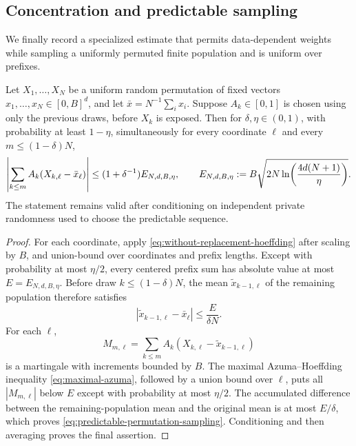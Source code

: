 \subsection{Concentration and predictable sampling}
\label{sec:probabilistic-tools}
\label{sec:standard-concentration}



We finally record a specialized estimate that permits data-dependent weights
while sampling a uniformly permuted finite population and is uniform over
prefixes.

\begin{lemma}
\label{lem:predictable-permutation-sampling}
Let $X_1,\ldots,X_N$ be a uniform random permutation of fixed vectors
$x_1,\ldots,x_N\in[0,B]^d$, and let
$\bar x=N^{-1}\sum_i x_i$.  Suppose $A_k\in[0,1]$ is chosen using only the
previous draws, before $X_k$ is exposed.  Then for
$\delta,\eta\in(0,1)$, with probability at least
$1-\eta$, simultaneously for every coordinate $\ell$ and every
$m\le(1-\delta)N$,
\begin{equation}
 \left|\sum_{k\le m}A_k(X_{k,\ell}-\bar x_\ell)\right|
 \le(1+\delta^{-1})E_{N,d,B,\eta},
 \qquad
 E_{N,d,B,\eta}\mathrel{:=}
 B\sqrt{2N\ln\!\left(\frac{4d(N+1)}{\eta}\right)}.
 \label{eq:predictable-permutation-sampling}
\end{equation}
The statement remains valid after conditioning on independent private
randomness used to choose the predictable sequence.
\end{lemma}

\begin{proof}
For each coordinate, apply
\cref{eq:without-replacement-hoeffding} after scaling by $B$, and union-bound
over coordinates and prefix lengths.  Except with probability at most
$\eta/2$, every centered prefix sum has absolute value at most
$E=E_{N,d,B,\eta}$.  Before draw $k\le(1-\delta)N$, the mean
$\widetilde x_{k-1,\ell}$ of
the remaining population therefore satisfies
\[
 |\widetilde x_{k-1,\ell}-\bar x_\ell|\le \frac{E}{\delta N}.
\]
For each $\ell$,
\[
 M_{m,\ell}=\sum_{k\le m}A_k(X_{k,\ell}-\widetilde x_{k-1,\ell})
\]
is a martingale with increments bounded by $B$.  The maximal
Azuma--Hoeffding inequality \cref{eq:maximal-azuma}, followed by a union
bound over $\ell$, puts all $|M_{m,\ell}|$ below $E$ except with probability at
most $\eta/2$.  The accumulated difference between the remaining-population
mean and the original mean is at most $E/\delta$, which proves
\cref{eq:predictable-permutation-sampling}.  Conditioning and then averaging
proves the final assertion.
\end{proof}
